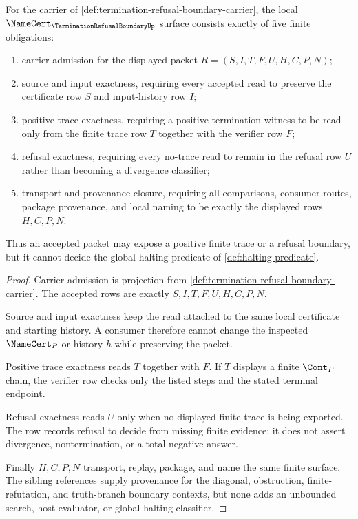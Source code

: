 \begin{theorem}
\label{thm:termination-refusal-boundary-namecert-obligations}
For the carrier of \autoref{def:termination-refusal-boundary-carrier}, the local $\NameCert_{\TerminationRefusalBoundaryUp}$ surface consists exactly of five finite obligations:
\begin{enumerate}
\item carrier admission for the displayed packet $R=(S,I,T,F,U,H,C,P,N)$;
\item source and input exactness, requiring every accepted read to preserve the certificate row $S$ and input-history row $I$;
\item positive trace exactness, requiring a positive termination witness to be read only from the finite trace row $T$ together with the verifier row $F$;
\item refusal exactness, requiring every no-trace read to remain in the refusal row $U$ rather than becoming a divergence classifier;
\item transport and provenance closure, requiring all comparisons, consumer routes, package provenance, and local naming to be exactly the displayed rows $H,C,P,N$.
\end{enumerate}
Thus an accepted packet may expose a positive finite trace or a refusal boundary, but it cannot decide the global halting predicate of \autoref{def:halting-predicate}.
\end{theorem}
\begin{proof}
Carrier admission is projection from \autoref{def:termination-refusal-boundary-carrier}. The accepted rows are exactly $S,I,T,F,U,H,C,P,N$.

Source and input exactness keep the read attached to the same local certificate and starting history. A consumer therefore cannot change the inspected $\NameCert_P$ or history $h$ while preserving the packet.

Positive trace exactness reads $T$ together with $F$. If $T$ displays a finite $\Cont_P$ chain, the verifier row checks only the listed steps and the stated terminal endpoint.

Refusal exactness reads $U$ only when no displayed finite trace is being exported. The row records refusal to decide from missing finite evidence; it does not assert divergence, nontermination, or a total negative answer.

Finally $H,C,P,N$ transport, replay, package, and name the same finite surface. The sibling references supply provenance for the diagonal, obstruction, finite-refutation, and truth-branch boundary contexts, but none adds an unbounded search, host evaluator, or global halting classifier.
\end{proof}

